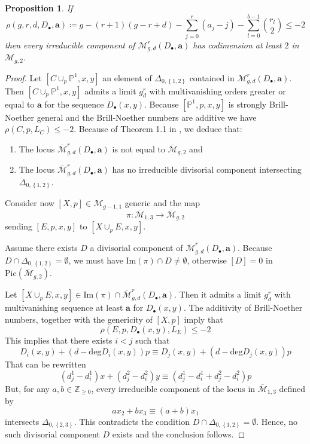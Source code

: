 \documentclass{article}
\theoremstyle{plain}
\newtheorem{prop}[trm]{Proposition}
\theoremstyle{definition}
\def\cM{\mathcal{M}}
\def\mm{\overline{\mathcal{M}}}
\begin{document}
\begin{prop} \label{rho-2} If 
	\[ \rho(g,r,d, D_\bullet, \textbf{a}) \coloneqq g-(r+1)(g-r+d)- \sum_{j=0}^{r}(a_j-j) - \sum_{l=0}^{b-1}\binom{r_l}{2} \leq -2 \]
	then every irreducible component of $\cM_{g,d}^r(D_\bullet, \textbf{a})$ has codimension at least $2$ in $\cM_{g,2}$.
\end{prop}
\begin{proof}
Let $[C\cup_p\mathbb{P}^1, x,y]$ an element of $\Delta_{0,\left\{1,2\right\}}$ contained in $\cM_{g,d}^r(D_\bullet, \textbf{a})$. Then $[C\cup_p\mathbb{P}^1, x,y]$ admits a limit $g^r_d$ with multivanishing orders greater or equal to $\textbf{a}$ for the sequence $D_\bullet(x,y)$. Because $[\mathbb{P}^1, p,x,y]$ is strongly Brill-Noether general and the Brill-Noether numbers are additive we have $\rho(C,p, L_C) \leq -2$. Because of Theorem 1.1 in \cite{IrreducibilityBN}, we deduce that: 
\begin{enumerate}
	\item The locus $\mm^r_{g,d}(D_\bullet, \textbf{a})$ is not equal to $\mm_{g,2}$ and 
	\item The locus $\mm^r_{g,d}(D_\bullet, \textbf{a})$ has no irreducible divisorial component intersecting $\Delta_{0,\left\{1,2\right\}}$.
\end{enumerate}
Consider now $[X,p] \in \cM_{g-1,1}$ generic and the map 
\[ \pi\colon \mm_{1,3} \rightarrow \mm_{g,2} \]
sending $[E,p,x,y]$ to $[X\cup_pE, x,y]$. 

Assume there exists $D$ a divisorial component of $\mm^r_{g,d}(D_\bullet, \textbf{a})$. Because $D\cap \Delta_{0,\left\{1,2\right\}} = \emptyset$,  we must have $\mathrm{Im}(\pi) \cap D \neq \emptyset$, otherwise $[D] = 0$ in $\mathrm{Pic}(\mm_{g,2})$. 

Let $[X\cup_pE,x,y] \in \mathrm{Im}(\pi)\cap \mm^r_{g,d}(D_\bullet, \textbf{a})$. Then it admits a limit $g^r_d$ with multivanishing sequence at least $\textbf{a}$ for $D_\bullet(x,y)$. The additivity of Brill-Noether numbers, together with the genericity of $[X,p]$ imply that 
\[ \rho(E, p, D_\bullet(x,y), L_E) \leq -2 \]
This implies that there exists $i<j$ such that 
\[ D_i(x,y) + (d-\mathrm{deg}D_i(x,y))p \equiv D_j(x,y) + (d-\mathrm{deg}D_j(x,y))p  \]
That can be rewritten 
\[ (d^1_j-d^1_i) x + (d^2_j-d^2_i)y \equiv (d^1_j-d^1_i +d^2_j-d^2_i) p \]
But, for any $a, b \in \mathbb{Z}_{\geq 0}$, every irreducible component of the locus in $\mm_{1,3}$ defined by 
\[ ax_2 +bx_3 \equiv (a+b)x_1 \]
intersects $\Delta_{0,\left\{2,3\right\}}$. This contradicts the condition $D\cap \Delta_{0,\left\{1,2\right\}} = \emptyset$. Hence, no such divisorial component $D$ exists and the conclusion follows.  

\end{proof}
\end{document}
